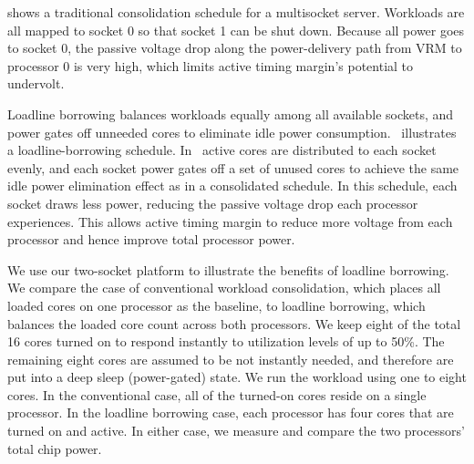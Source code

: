  shows a traditional consolidation schedule for a multisocket server. Workloads are all mapped to socket 0 so that socket 1 can be shut down. Because all power goes to socket 0, the passive voltage drop along the power-delivery path from VRM to processor 0 is very high, which limits active timing margin's potential to undervolt.

Loadline borrowing balances workloads equally among all available sockets, and power gates off unneeded cores to eliminate idle power consumption.~ illustrates a loadline-borrowing schedule. In~ active cores are distributed to each socket evenly, and each socket power gates off a set of unused cores to achieve the same idle power elimination effect as in a consolidated schedule. In this schedule, each socket draws less power, reducing the passive voltage drop each processor experiences. This allows active timing margin to reduce more voltage from each processor and hence improve total processor power.

We use our two-socket platform to illustrate the benefits of loadline borrowing. We compare the case of conventional workload consolidation, which places all loaded cores on one processor as the baseline, to loadline borrowing, which balances the loaded core count across both processors. We keep eight of the total 16 cores turned on to respond instantly to utilization levels of up to 50\%. The remaining eight cores are assumed to be not instantly needed, and therefore are put into a deep sleep (power-gated) state. We run the workload using one to eight cores. In the conventional case, all of the turned-on cores reside on a single processor. In the loadline borrowing case, each processor has four cores that are turned on and active. In either case, we measure and compare the two processors' total chip power.

